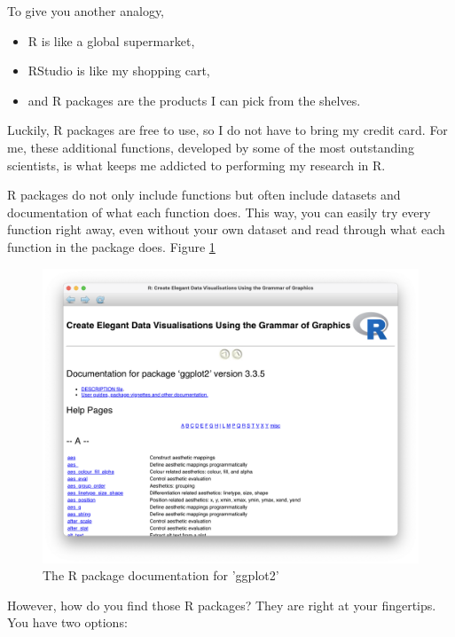 \documentclass[
]{book}
\begin{document}
To give you another analogy,

\begin{itemize}
\item
  R is like a global supermarket,
\item
  RStudio is like my shopping cart,
\item
  and R packages are the products I can pick from the shelves.
\end{itemize}

Luckily, R packages are free to use, so I do not have to bring my credit card. For me, these additional functions, developed by some of the most outstanding scientists, is what keeps me addicted to performing my research in R.

R packages do not only include functions but often include datasets and documentation of what each function does. This way, you can easily try every function right away, even without your own dataset and read through what each function in the package does. Figure \ref{fig:img-r-package-documentation}

\begin{figure}

{\centering \includegraphics[width=28.08in]{images/chapter_05_img/r_package_documentation} 

}

\caption{The R package documentation for 'ggplot2'}\label{fig:img-r-package-documentation}
\end{figure}

However, how do you find those R packages? They are right at your fingertips. You have two options:
\end{document}
